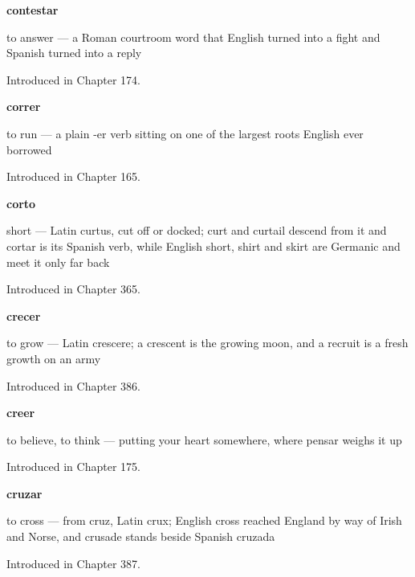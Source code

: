 \noindent\begin{minipage}[t]{\linewidth}
\raggedright
\textbf{contestar}\par
\small to answer — a Roman courtroom word that English turned into a fight and Spanish turned into a reply\par
\footnotesize Introduced in Chapter 174.
\end{minipage}\par\medskip

\noindent\begin{minipage}[t]{\linewidth}
\raggedright
\textbf{correr}\par
\small to run — a plain -er verb sitting on one of the largest roots English ever borrowed\par
\footnotesize Introduced in Chapter 165.
\end{minipage}\par\medskip

\noindent\begin{minipage}[t]{\linewidth}
\raggedright
\textbf{corto}\par
\small short — Latin curtus, cut off or docked; curt and curtail descend from it and cortar is its Spanish verb, while English short, shirt and skirt are Germanic and meet it only far back\par
\footnotesize Introduced in Chapter 365.
\end{minipage}\par\medskip

\noindent\begin{minipage}[t]{\linewidth}
\raggedright
\textbf{crecer}\par
\small to grow — Latin crescere; a crescent is the growing moon, and a recruit is a fresh growth on an army\par
\footnotesize Introduced in Chapter 386.
\end{minipage}\par\medskip

\noindent\begin{minipage}[t]{\linewidth}
\raggedright
\textbf{creer}\par
\small to believe, to think — putting your heart somewhere, where pensar weighs it up\par
\footnotesize Introduced in Chapter 175.
\end{minipage}\par\medskip

\noindent\begin{minipage}[t]{\linewidth}
\raggedright
\textbf{cruzar}\par
\small to cross — from cruz, Latin crux; English cross reached England by way of Irish and Norse, and crusade stands beside Spanish cruzada\par
\footnotesize Introduced in Chapter 387.
\end{minipage}\par\medskip

